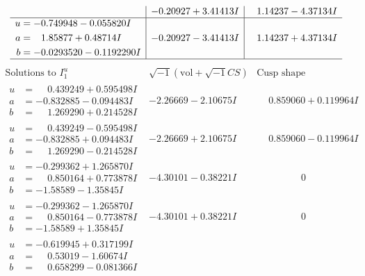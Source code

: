 \documentclass[1p]{elsarticle_modified}
\theoremstyle{definition}
\newcommand{\I}{\sqrt{-1}}
\begin{document}
$$\begin{array}{c|c|c}
 & -0.20927 + 3.41413 I & \phantom{-}1.14237 - 4.37134 I \\ \hline\begin{aligned}
u &= -0.749948 - 0.055820 I \\
a &= \phantom{-}1.85877 + 0.48714 I \\
b &= -0.0293520 - 0.1192290 I\end{aligned}
 & -0.20927 - 3.41413 I & \phantom{-}1.14237 + 4.37134 I\\
 \hline 
 \end{array}$$\newpage$$\begin{array}{c|c|c}  
\text{Solutions to }I^u_{1}& \I (\text{vol} + \sqrt{-1}CS) & \text{Cusp shape}\\
 \hline 
\begin{aligned}
u &= \phantom{-}0.439249 + 0.595498 I \\
a &= -0.832885 - 0.094483 I \\
b &= \phantom{-}1.269290 + 0.214528 I\end{aligned}
 & -2.26669 - 2.10675 I & \phantom{-}0.859060 + 0.119964 I \\ \hline\begin{aligned}
u &= \phantom{-}0.439249 - 0.595498 I \\
a &= -0.832885 + 0.094483 I \\
b &= \phantom{-}1.269290 - 0.214528 I\end{aligned}
 & -2.26669 + 2.10675 I & \phantom{-}0.859060 - 0.119964 I \\ \hline\begin{aligned}
u &= -0.299362 + 1.265870 I \\
a &= \phantom{-}0.850164 + 0.773878 I \\
b &= -1.58589 - 1.35845 I\end{aligned}
 & -4.30101 - 0.38221 I & \phantom{-0.000000 } 0 \\ \hline\begin{aligned}
u &= -0.299362 - 1.265870 I \\
a &= \phantom{-}0.850164 - 0.773878 I \\
b &= -1.58589 + 1.35845 I\end{aligned}
 & -4.30101 + 0.38221 I & \phantom{-0.000000 } 0 \\ \hline\begin{aligned}
u &= -0.619945 + 0.317199 I \\
a &= \phantom{-}0.53019 - 1.60674 I \\
b &= \phantom{-}0.658299 - 0.081366 I\end{aligned}

\end{array}$$
\end{document}
